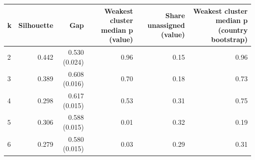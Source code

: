 \begin{tabular}{lrrrrr}
\toprule
k & Silhouette & Gap & Weakest cluster median p (value) & Share unassigned (value) & Weakest cluster median p (country bootstrap) \\
\midrule
2 & 0.442 & 0.530 (0.024) & 0.96 & 0.15 & 0.96 \\
3 & 0.389 & 0.608 (0.016) & 0.70 & 0.18 & 0.73 \\
4 & 0.298 & 0.617 (0.015) & 0.53 & 0.31 & 0.75 \\
5 & 0.306 & 0.588 (0.015) & 0.01 & 0.32 & 0.19 \\
6 & 0.279 & 0.580 (0.015) & 0.03 & 0.29 & 0.31 \\
\bottomrule
\end{tabular}
